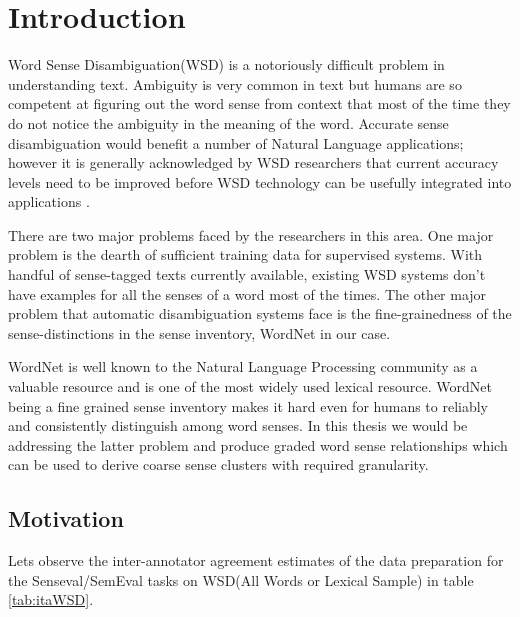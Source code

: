 \chapter{Introduction}

Word Sense Disambiguation(WSD) is a notoriously difficult problem in understanding text. Ambiguity is very common in text but humans are so competent at figuring out the word sense from context that most of the time they do not notice the ambiguity in the meaning of the word. Accurate sense disambiguation would benefit a number of Natural Language applications; however it is generally acknowledged by WSD researchers that current accuracy levels need to be improved before WSD technology can be usefully integrated into applications \citep{ide2006making}.

There are two major problems faced by the researchers in this area. One major problem is the dearth of sufficient training data for supervised systems. With handful of sense-tagged texts currently available, existing WSD systems don't have examples for all the senses of a word most of the times. The other major problem that automatic disambiguation systems face is the fine-grainedness of the sense-distinctions in the sense inventory, WordNet in our case. 

WordNet \citep{miller1995wordnet} \citep{fellbaum1998wordnet} is well known to the Natural Language Processing community as a valuable resource and is one of the most widely used lexical resource. WordNet being a fine grained sense inventory makes it hard even for humans to reliably and consistently distinguish among word senses. In this thesis we would be addressing the latter problem and produce graded word sense relationships which can be used to derive coarse sense clusters with required granularity.


\section{Motivation}

Lets observe the inter-annotator agreement estimates of the data preparation for the Senseval/SemEval tasks on WSD(All Words or Lexical Sample) in table \ref{tab:itaWSD}.

